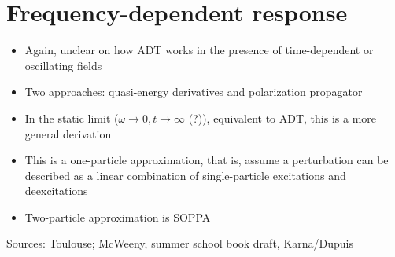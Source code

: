 \documentclass[%
class = book,%
crop = false,%
float = true,%
multi = true,%
preview = false,%
]{standalone}
\begin{document}
\section{Frequency-dependent response}

\begin{itemize}
\item Again, unclear on how ADT works in the presence of time-dependent or oscillating fields
\item Two approaches: quasi-energy derivatives and polarization propagator
\item In the static limit (\(\omega \rightarrow 0, t \rightarrow \infty\) (?)), equivalent to ADT, this is a more general derivation
\item This is a one-particle approximation, that is, assume a perturbation can be described as a linear combination of single-particle excitations and deexcitations
\item Two-particle approximation is SOPPA
\end{itemize}

Sources: Toulouse; McWeeny, summer school book draft, Karna/Dupuis
\end{document}
